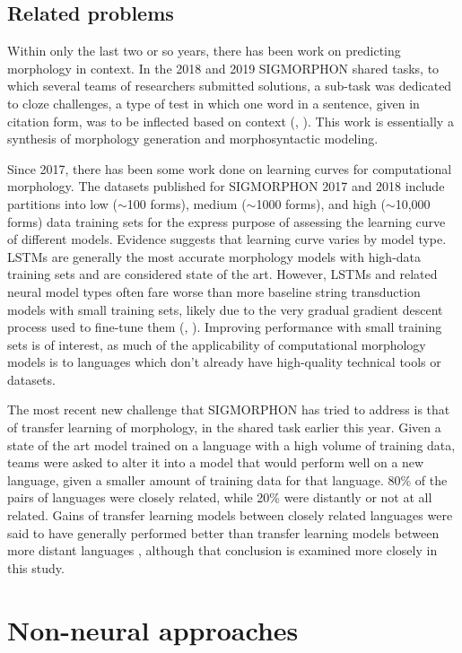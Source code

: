 \subsection{Related problems}

Within only the last two or so years, there has been work on predicting morphology in context. In the 2018 and 2019 SIGMORPHON shared tasks, to which several teams of researchers submitted solutions, a sub-task was dedicated to cloze challenges, a type of test in which one word in a sentence, given in citation form, was to be inflected based on context (\cite{Cotterell2018b}, \cite{McCarthy2019}). This work is essentially a synthesis of morphology generation and morphosyntactic modeling.

Since 2017, there has been some work done on learning curves for computational morphology. The datasets published for SIGMORPHON 2017 and 2018 include partitions into low ($\sim$100 forms), medium ($\sim$1000 forms), and high ($\sim$10,000 forms) data training sets for the express purpose of assessing the learning curve of different models. Evidence suggests that learning curve varies by model type. LSTMs are generally the most accurate morphology models with high-data training sets and are considered state of the art. However, LSTMs and related neural model types often fare worse than more baseline string transduction models with small training sets, likely due to the very gradual gradient descent process used to fine-tune them (\cite{Cotterell2017a}, \cite{Cotterell2018b}). Improving performance with small training sets is of interest, as much of the applicability of computational morphology models is to languages which don't already have high-quality technical tools or datasets. 

The most recent new challenge that SIGMORPHON has tried to address is that of transfer learning of morphology, in the shared task earlier this year. Given a state of the art model trained on a language with a high volume of training data, teams were asked to alter it into a model that would perform well on a new language, given a smaller amount of training data for that language. 80\% of the pairs of languages were closely related, while 20\% were distantly or not at all related. Gains of transfer learning models between closely related languages were said to have generally performed better than transfer learning models between more distant languages \parencite{McCarthy2019}, although that conclusion is examined more closely in this study.

\section{Non-neural approaches}


